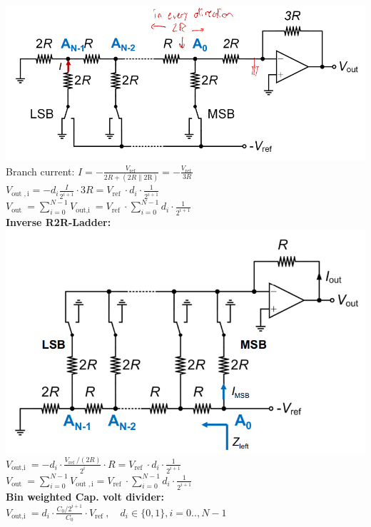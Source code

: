 \documentclass[5pt,landscape]{article}
\begin{document}
\begin{multicols*}{5}
\includegraphics[width=\columnwidth]{images/dac_r2r_ladder.png}
Branch current: $ I=-\frac{V_{\text {ref }}}{2 R+(2 R \| 2 \mathrm{R})}=-\frac{V_{\text {ref }}}{3 R} $\\
$ V_{\text {out }, \mathrm{i}}=-d_{i} \frac{I}{2^{i+1}} \cdot 3 R=V_{\text {ref }} \cdot d_{i} \cdot \frac{1}{2^{i+1}} $\\
$ V_{\text {out }}=\sum_{i=0}^{N-1} V_{\text {out,i }}=V_{\text {ref }} \cdot \sum_{i=0}^{N-1} d_{i} \cdot \frac{1}{2^{i+1}} $\\
\textbf{Inverse R2R-Ladder:}\\
\includegraphics[width=\columnwidth]{images/dac_inverse_r2r.png}\\
$ V_{\text {out,i }}=-d_{i} \cdot \frac{V_{\text {ref }} /(2 R)}{2^{i}} \cdot R=V_{\text {ref }} \cdot d_{i} \cdot \frac{1}{2^{i+1}} $\\
$ V_{\text {out }}=\sum_{i=0}^{N-1} V_{\text {out }, \mathrm{i}}=V_{\text {ref }} \cdot \sum_{i=0}^{N-1} d_{i} \cdot \frac{1}{2^{i+1}} $\\
\textbf{Bin weighted Cap. volt divider:}\\
$ V_{\text {out,i }}=d_{i} \cdot \frac{C_{0} / 2^{i+1}}{C_{0}} \cdot V_{\text {ref }}, \quad d_{i} \in\{0,1\}, i=0 . ., N-1 $\\

\end{multicols*}
\end{document}
